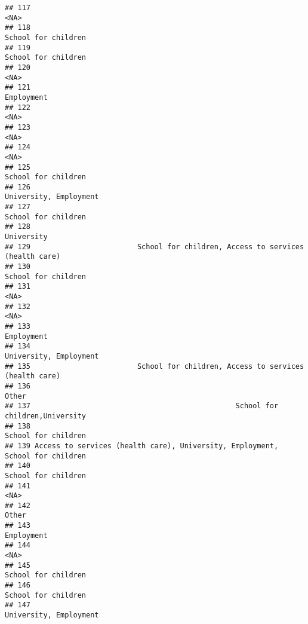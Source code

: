 \documentclass[
]{article}
\begin{document}
\begin{verbatim}
## 117                                                                          <NA>
## 118                                                           School for children
## 119                                                           School for children
## 120                                                                          <NA>
## 121                                                                    Employment
## 122                                                                          <NA>
## 123                                                                          <NA>
## 124                                                                          <NA>
## 125                                                           School for children
## 126                                                        University, Employment
## 127                                                           School for children
## 128                                                                    University
## 129                         School for children, Access to services (health care)
## 130                                                           School for children
## 131                                                                          <NA>
## 132                                                                          <NA>
## 133                                                                    Employment
## 134                                                        University, Employment
## 135                         School for children, Access to services (health care)
## 136                                                                         Other
## 137                                                School for children,University
## 138                                                           School for children
## 139 Access to services (health care), University, Employment, School for children
## 140                                                           School for children
## 141                                                                          <NA>
## 142                                                                         Other
## 143                                                                    Employment
## 144                                                                          <NA>
## 145                                                           School for children
## 146                                                           School for children
## 147                                                        University, Employment

\end{verbatim}
\end{document}
